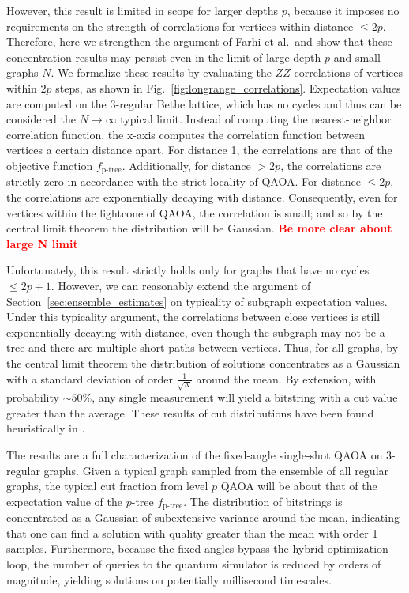 \documentclass[prb,reprint,nofootinbib,longbibliography,superscriptaddress]{revtex4-1}
\newcommand*{\red}{\textcolor{red}}
\newcommand{\jw}[1]{{\textbf{\red{#1}}}}
\begin{document}
However, this result is limited in scope for larger depths $p$, because it imposes no requirements on the strength of correlations for vertices within distance $\leq2p$. Therefore, here we strengthen the argument of Farhi et al.~and show that these concentration results may persist even in the limit of large depth $p$ and small graphs $N$. We formalize these results by evaluating the $ZZ$ correlations of vertices within $2p$ steps, as shown in Fig.~\ref{fig:longrange_correlations}. Expectation values are computed on the 3-regular Bethe lattice, which has no cycles and thus can be considered the $N\to\infty$ typical limit. Instead of computing the nearest-neighbor correlation function, the x-axis computes the correlation function between vertices a certain distance apart. For distance 1, the correlations are that of the objective function $f_\text{p-tree}$. Additionally, for  distance $>2p$, the correlations are strictly zero in accordance with the strict locality of QAOA. For distance $\leq 2p$, the correlations are exponentially decaying with distance. Consequently, even for vertices within the lightcone of QAOA, the correlation is small; and so by the central limit theorem the distribution will be Gaussian.  \jw{Be more clear about large N limit}

Unfortunately, this result  strictly holds only for graphs that have no cycles $\leq 2p+1$. However, we can reasonably  extend the argument of Section~\ref{sec:ensemble_estimates} on typicality of subgraph expectation values. Under this typicality argument, the correlations between close vertices is still exponentially decaying with distance, even though the subgraph may not be a tree and there are multiple short paths between vertices. Thus, for all graphs, by the central limit theorem the distribution of solutions concentrates as a Gaussian with a standard deviation of order $\frac{1}{\sqrt{N}}$ around the mean. By extension, with probability $\sim 50\%$, any single measurement will yield a bitstring with a cut value greater than the average. These results of cut distributions have been found heuristically in \cite{larkin2020evaluation}.

\quad

The results are a full characterization of the fixed-angle single-shot QAOA on 3-regular graphs. Given a typical graph sampled from the ensemble of all regular graphs, the typical cut fraction from level $p$ QAOA will be about that of the expectation value of the $p$-tree $f_{\text{p-tree}}$. The distribution of bitstrings is concentrated as a Gaussian of subextensive variance around the mean, indicating that one can find a solution with quality greater than the mean with order 1 samples. Furthermore, because the fixed angles bypass the hybrid optimization loop, the number of queries to the quantum simulator is reduced by orders of magnitude, yielding solutions on potentially  millisecond timescales.
\end{document}
